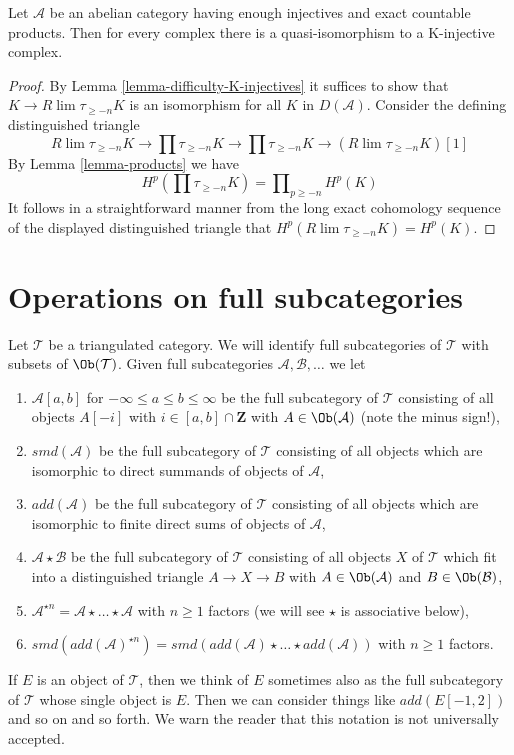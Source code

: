 \begin{lemma}
\label{lemma-enough-K-injectives-Ab4-star}
Let $\mathcal{A}$ be an abelian category having enough injectives
and exact countable products. Then for every complex
there is a quasi-isomorphism to a K-injective complex.
\end{lemma}

\begin{proof}
By Lemma \ref{lemma-difficulty-K-injectives} it suffices to show that
$K \to R\lim\tau_{\geq -n}K$ is an isomorphism for all $K$ in $D(\mathcal{A})$.
Consider the defining distinguished triangle
$$
R\lim\tau_{\geq -n}K \to
\prod \tau_{\geq -n}K \to
\prod \tau_{\geq -n}K \to
(R\lim\tau_{\geq -n}K)[1]
$$
By Lemma \ref{lemma-products} we have
$$
H^p(\prod \tau_{\geq -n}K) = \prod\nolimits_{p \geq -n} H^p(K)
$$
It follows in a straightforward manner from the long exact cohomology
sequence of the displayed distinguished triangle
that $H^p(R\lim \tau_{\geq -n}K) = H^p(K)$.
\end{proof}




\section{Operations on full subcategories}
\label{section-operate-on-full}

\noindent
Let $\mathcal{T}$ be a triangulated category. We will identify full
subcategories of $\mathcal{T}$ with subsets of $\Ob(\mathcal{T})$.
Given full subcategories $\mathcal{A}, \mathcal{B}, \ldots$ we let
\begin{enumerate}
\item $\mathcal{A}[a, b]$ for $-\infty \leq a \leq b \leq \infty$
be the full subcategory of $\mathcal{T}$ consisting of all objects
$A[-i]$ with $i \in [a, b] \cap \mathbf{Z}$
with $A \in \Ob(\mathcal{A})$ (note the minus sign!),
\item $smd(\mathcal{A})$ be the full subcategory of $\mathcal{T}$
consisting of all objects which are isomorphic to direct summands of objects
of $\mathcal{A}$,
\item $add(\mathcal{A})$ be the full subcategory of $\mathcal{T}$
consisting of all objects which are isomorphic to finite direct sums of objects
of $\mathcal{A}$,
\item $\mathcal{A} \star \mathcal{B}$ be the full subcategory of $\mathcal{T}$
consisting of all objects $X$ of $\mathcal{T}$ which fit into a distinguished
triangle $A \to X \to B$ with $A \in \Ob(\mathcal{A})$ and
$B \in \Ob(\mathcal{B})$,
\item $\mathcal{A}^{\star n} = \mathcal{A} \star \ldots \star \mathcal{A}$
with $n \geq 1$ factors (we will see $\star$ is associative below),
\item $smd(add(\mathcal{A})^{\star n}) =
smd(add(\mathcal{A}) \star \ldots \star add(\mathcal{A}))$
with $n \geq 1$ factors.
\end{enumerate}
If $E$ is an object of $\mathcal{T}$, then we think of $E$ sometimes
also as the full subcategory of $\mathcal{T}$ whose single object is $E$.
Then we can consider things like $add(E[-1, 2])$ and so on and so forth.
We warn the reader that this notation is not universally accepted.

